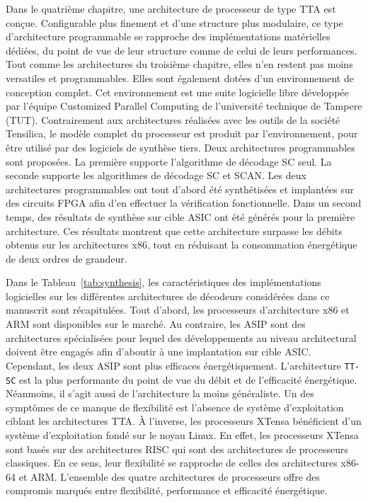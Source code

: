 Dans le quatrième chapitre, une architecture de processeur de type TTA est conçue. Configurable plus finement et d'une structure plus modulaire, ce type d'architecture programmable se rapproche des implémentations matérielles dédiées, du point de vue de leur structure comme de celui de leurs performances. Tout comme les architectures du troisième chapitre, elles n'en restent pas moins versatiles et programmables. Elles sont également dotées d'un environnement de conception complet. Cet environnement est une suite logicielle libre développée par l'équipe \og Customized Parallel Computing \fg de l'université technique de Tampere (TUT). Contrairement aux architectures réalisées avec les outils de la société Tensilica, le modèle complet du processeur est produit par l'environnement, pour être utilisé par des logiciels de synthèse tiers. Deux architectures programmables sont proposées. La première supporte l'algorithme de décodage SC seul. La seconde supporte les algorithmes de décodage SC et SCAN. Les deux architectures programmables ont tout d'abord été synthétisées et implantées sur des circuits FPGA afin d'en effectuer la vérification fonctionnelle. Dans un second temps, des résultats de synthèse sur cible ASIC ont été générés pour la première architecture. Ces résultats montrent que cette architecture surpasse les débits obtenus sur les architectures x86, tout en réduisant la consommation énergétique de deux ordres de grandeur.

Dans le Tableau~\ref{tab:synthesis}, les caractéristiques des implémentations logicielles sur les différentes architectures de décodeurs considérées dans ce manuscrit sont récapitulées. Tout d'abord, les processeurs d'architecture x86 et ARM sont disponibles sur le marché. Au contraire, les ASIP sont des architectures spécialisées pour lequel des développements au niveau architectural doivent être engagés afin d'aboutir à une implantation sur cible ASIC. Cependant, les deux ASIP sont plus efficaces énergétiquement. L'architecture \texttt{TT-SC} est la plus performante du point de vue du débit et de l'efficacité énergétique. Néanmoins, il s'agit aussi de l'architecture la moins généraliste. Un des symptômes de ce manque de flexibilité est l'absence de système d'exploitation ciblant les architectures TTA. \`A l'inverse, les processeurs XTensa bénéficient d'un système d'exploitation fondé sur le noyau Linux. En effet, les processeurs XTensa sont basés sur des architectures RISC qui sont des architectures de processeurs classiques. En ce sens, leur flexibilité se rapproche de celles des architectures x86-64 et ARM.
L'ensemble des quatre architectures de processeurs offre des compromis marqués entre flexibilité, performance et efficacité énergétique.

